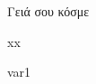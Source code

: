 \documentclass[12pt,a4paper,oneside]{article}
\begin{document}
Γειά σου κόσμε
	\begin{jinja} xx \end{jinja}
	{{var1}}
\end{document}
